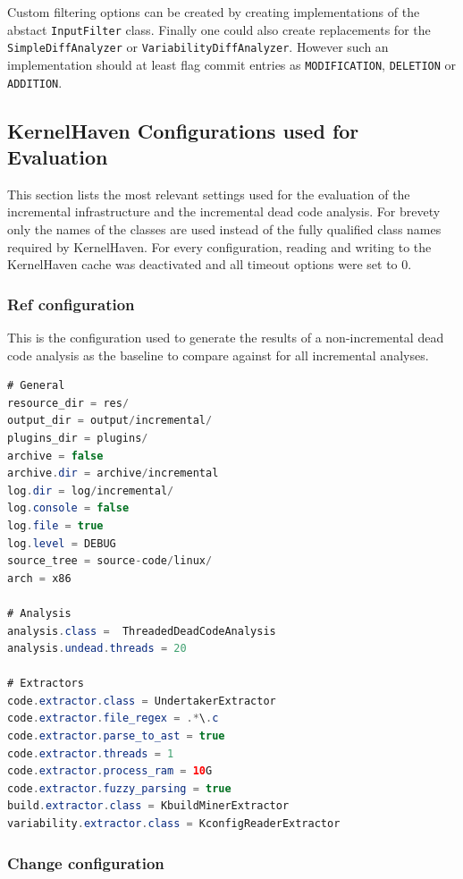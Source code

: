 \documentclass[a4paper]{article}
\begin{document}
Custom filtering options can be created by creating implementations of the abstact \texttt{InputFilter} class. Finally one could also create replacements for the \texttt{SimpleDiffAnalyzer} or \texttt{VariabilityDiffAnalyzer}. However such an implementation should at least flag commit entries as \texttt{MODIFICATION}, \texttt{DELETION} or \texttt{ADDITION}.


\subsection{KernelHaven Configurations used for Evaluation} \label{config-evaluation}
This section lists the most relevant settings used for the evaluation of the incremental infrastructure and the incremental dead code analysis. For brevety only the names of the classes are used instead of the fully qualified class names required by KernelHaven. For every configuration, reading and writing to the KernelHaven cache was deactivated and all timeout options were set to 0.

\subsubsection{Ref configuration}

This is the configuration used to generate the results of a non-incremental dead code analysis as the baseline to compare against for all incremental analyses.

\begin{lstlisting}[language=java]
# General
resource_dir = res/
output_dir = output/incremental/
plugins_dir = plugins/
archive = false
archive.dir = archive/incremental
log.dir = log/incremental/
log.console = false
log.file = true
log.level = DEBUG
source_tree = source-code/linux/
arch = x86

# Analysis  
analysis.class =  ThreadedDeadCodeAnalysis
analysis.undead.threads = 20

# Extractors  
code.extractor.class = UndertakerExtractor
code.extractor.file_regex = .*\.c
code.extractor.parse_to_ast = true
code.extractor.threads = 1
code.extractor.process_ram = 10G
code.extractor.fuzzy_parsing = true
build.extractor.class = KbuildMinerExtractor
variability.extractor.class = KconfigReaderExtractor
\end{lstlisting}

\clearpage


\subsubsection{Change configuration}
\end{document}
